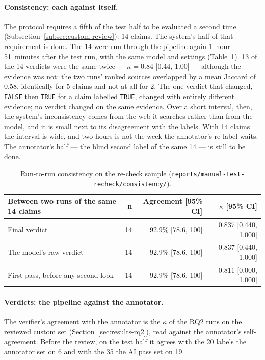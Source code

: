 \paragraph{Consistency: each against itself.} The protocol requires a
fifth of the test half to be evaluated a second time
(Subsection~\ref{subsec:custom-review}): 14 claims. The system's half of
that requirement is done. The 14 were run through the pipeline again
1~hour 51~minutes after the test run, with the same model and settings
(Table~\ref{tab:consistency}). 13 of the 14 verdicts were the same
twice --- $\kappa = 0.84$ [0.44, 1.00] --- although the evidence was
not: the two runs' ranked sources overlapped by a mean Jaccard of 0.58,
identically for 5 claims and not at all for 2. The one verdict that
changed, \texttt{FALSE} then \texttt{TRUE} for a claim labelled
\texttt{TRUE}, changed with entirely different evidence; no verdict
changed on the same evidence. Over a short interval, then, the system's
inconsistency comes from the web it searches rather than from the model,
and it is small next to its disagreement with the labels. With 14
claims the interval is wide, and two hours is not the week the
annotator's re-label waits. The annotator's half --- the blind second
label of the same 14 --- is still to be done.

\begin{table}[ht]
\centering
\small
\begin{tabular}{@{}lrrr@{}}
\toprule
\textbf{Between two runs of the same 14 claims} & \textbf{n} & \textbf{Agreement [95\% CI]} & \textbf{$\kappa$ [95\% CI]} \\
\midrule
Final verdict & 14 & 92.9\% [78.6, 100] & 0.837 [0.440, 1.000] \\
The model's raw verdict & 14 & 92.9\% [78.6, 100] & 0.837 [0.440, 1.000] \\
First pass, before any second look & 14 & 92.9\% [78.6, 100] & 0.811 [0.000, 1.000] \\
\bottomrule
\end{tabular}
\caption[Run-to-run consistency on the re-check sample]{Run-to-run consistency on the re-check sample
(\texttt{reports/manual-test-recheck/consistency/}).}
\label{tab:consistency}
\end{table}

\paragraph{Verdicts: the pipeline against the annotator.} The
verifier's agreement with the annotator is the $\kappa$ of the RQ2 runs
on the reviewed custom set (Section~\ref{sec:results-rq2}), read against
the annotator's self-agreement. Before the review, on the test half it
agrees with the 20 labels the annotator set on 6 and with the 35 the AI
pass set on 19.

